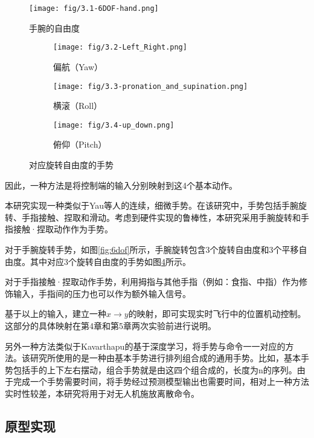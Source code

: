 \begin{figure}[t]
    \vspace{-20pt}
    \centering
    \texttt{[image: fig/3.1-6DOF-hand.png]}
    \caption{手腕的自由度}
    \label{fig:6dof}

    \centering
    \begin{subfigure}[b]{0.3\textwidth}
        \texttt{[image: fig/3.2-Left\_Right.png]}
        \caption{偏航（Yaw）}
        \label{fig:yaw}
    \end{subfigure}
    \hfill
    \begin{subfigure}[b]{0.3\textwidth}
        \texttt{[image: fig/3.3-pronation\_and\_supination.png]}
        \caption{横滚（Roll）}
        \label{fig:roll}
    \end{subfigure}
    \hfill
    \begin{subfigure}[b]{0.3\textwidth}
        \texttt{[image: fig/3.4-up\_down.png]}
        \caption{俯仰（Pitch）}
        \label{fig:pitch}
    \end{subfigure}
    \caption{对应旋转自由度的手势}
    \label{fig:three-guesture}
\end{figure}

\clearpage
因此，一种方法是将控制端的输入分别映射到这4个基本动作。

本研究实现一种类似于Yau等人\cites{yau2020subtle}的连续，细微手势。在该研究中，手势包括手腕旋转、手指接触、捏取和滑动。考虑到硬件实现的鲁棒性，本研究采用手腕旋转和手指接触·捏取动作作为手势。

对于手腕旋转手势，如图\ref{fig:6dof}所示，手腕旋转包含3个旋转自由度和3个平移自由度。其中对应3个旋转自由度的手势如图\ref{fig:three-guesture}所示。

对于手指接触·捏取动作手势，利用拇指与其他手指（例如：食指、中指）作为修饰输入，手指间的压力也可以作为额外输入信号。

基于以上的输入，建立一种$x\xrightarrow{}y$的映射，即可实现实时飞行中的位置机动控制。这部分的具体映射在第4章和第5章两次实验前进行说明。


另外一种方法类似于Kavarthapu\cites{kavarthapu2017hand}的基于深度学习，将手势与命令一一对应的方法。该研究所使用的是一种由基本手势进行排列组合成的通用手势。比如，基本手势包括手的上下左右摆动，组合手势就是由这四个组合成的，长度为n的序列。由于完成一个手势需要时间，将手势经过预测模型输出也需要时间，相对上一种方法实时性较差，本研究将用于对无人机施放离散命令。

\subsection{原型实现}\label{ssec:num1}

